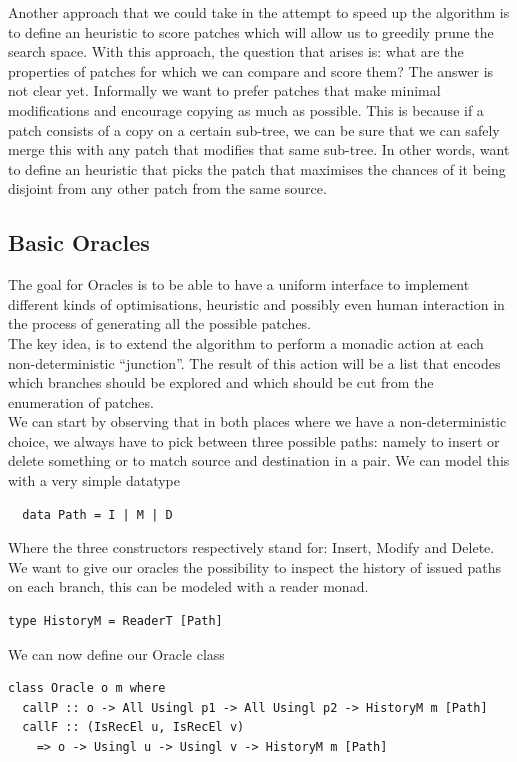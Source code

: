 \documentclass[11pt, titlepage]{article}
\begin{document}
Another approach that we could take in the attempt to speed up the algorithm is to define an heuristic to score patches which will allow us to greedily prune the search space. 
With this approach, the question that arises is: what are the properties of patches for which we can compare and score them? The answer is not clear yet. Informally we want to prefer patches that make minimal modifications and encourage copying as much as possible. This is because 
if a patch consists of a copy on a certain sub-tree, we can be sure that we can 
safely merge this with any patch that modifies that same sub-tree. 
In other words, want to define an heuristic that picks the patch that maximises the chances of it being disjoint from any other patch from the same source.
\\
\subsection{Basic Oracles}\label{oracles}
The goal for Oracles is to be able to have a uniform interface to implement different kinds of optimisations, heuristic and possibly even human interaction in the process of generating all the possible patches.
 \\
The key idea, is to extend the algorithm to perform a monadic action at each non-deterministic ``junction''. The result of this action will be a list that encodes which branches should be explored and which should be cut from the enumeration of patches.
\\
We can start by observing that in both places where we have a non-deterministic choice, we always have to pick between three possible paths: namely to insert or delete something or to match source and destination in a pair. We can model this with a very simple datatype

\begin{verbatim}
  data Path = I | M | D 
\end{verbatim}

Where the three constructors respectively stand for: Insert, Modify and Delete.
We want to give our oracles the possibility to inspect the history of issued paths on each branch, this can be modeled with a reader monad.

\begin{verbatim}
type HistoryM = ReaderT [Path]
\end{verbatim}

We can now define our Oracle class

\begin{verbatim}
class Oracle o m where
  callP :: o -> All Usingl p1 -> All Usingl p2 -> HistoryM m [Path]
  callF :: (IsRecEl u, IsRecEl v) 
  	=> o -> Usingl u -> Usingl v -> HistoryM m [Path]
\end{verbatim}
\end{document}
